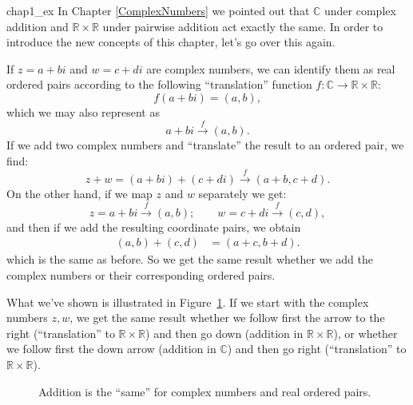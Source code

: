 \begin{example}{chap1_ex}
In Chapter \ref{ComplexNumbers} we pointed out that ${\mathbb C}$ under complex addition and ${\mathbb R} \times {\mathbb R}$ under pairwise addition act exactly the same. In order to introduce the new concepts of this chapter, let's go over this again. 

If $z = a+bi$ and $w = c+di$ are complex numbers, we can identify  them as real ordered pairs according to the following ``translation'' function $f:\mathbb{C} \rightarrow \mathbb{R} \times \mathbb{R}$:
\[f(a+bi) = (a,b),\]
which we may also represent as
\[ a+bi \xrightarrow{f} (a,b). \]
If we add two complex numbers and ``translate'' the result to an ordered pair, we find:
\[
z + w = (a + bi) + (c + di)  \xrightarrow{f} (a+b,c+d).
\]
On the other hand, if we map $z$ and $w$ separately we get:
\[
z = a + bi  \xrightarrow{f} (a,b);\qquad w = c+di  \xrightarrow{f} (c,d),
\]
and then if we add the resulting  coordinate pairs, we obtain
\begin{align*}
(a,b) +  (c,d) 
&= (a+c,b+d). 
\end{align*}
which is the same as before. So we get the same result whether we add the complex numbers or their corresponding ordered pairs.  

What we've shown  is illustrated in Figure~\ref{fig:groups:CommDiag}. If we start with the complex numbers $z,w$, we get the same result whether we follow first the arrow to the right (``translation'' to ${\mathbb R} \times {\mathbb R}$) and then go down (addition in ${\mathbb R} \times {\mathbb R}$), or whether we follow first the down arrow (addition in ${\mathbb C}$) and then go right (``translation'' to ${\mathbb R} \times {\mathbb R}$).

\begin{figure}[htb]
	  \caption{\label{fig:groups:CommDiag} Addition is the ``same'' for complex numbers and real ordered pairs. }
\end{figure}

\end{example}

